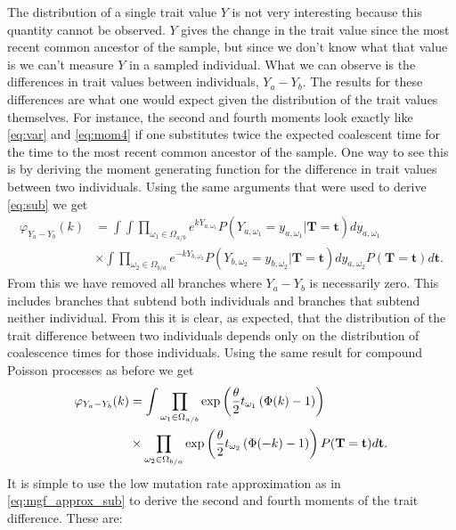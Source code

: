 The distribution of a single trait value $Y$ is not very interesting because
this quantity cannot be observed. $Y$ gives the change in the trait value since
the most recent common ancestor of the sample, but since we don't know what that
value is we can't measure $Y$ in a sampled individual. What we can observe is
the differences in trait values between individuals, $Y_a-Y_b$. The results for
these differences are what one would expect given the distribution of the trait
values themselves. For instance, the second and fourth moments look exactly like
\eqref{eq:var} and \eqref{eq:mom4} if one substitutes twice the expected
coalescent time for the time to the most recent common ancestor of the sample.
One way to see this is by deriving the moment generating function for the
difference in trait values between two individuals. Using the same arguments 
that were used to derive \eqref{eq:sub} we get
\begin{align}
  \varphi_{Y_a-Y_b}(k) &= \int \int \prod_{\omega_1 \in \Omega_{a/b}}
                         e^{kY_{a,\omega_1}}P(Y_{a,\omega_1}=y_{a,\omega_1}|\mathbf{T}=\mathbf{t})dy_{a,\omega_1} \nonumber \\
                         &\times \int \prod_{\omega_2 \in \Omega_{b/a}}
                         e^{-kY_{b,\omega_2}}P(Y_{b,\omega_2}=y_{b,\omega_2}|\mathbf{T}=\mathbf{t})dy_{a,\omega_2}
                         P(\mathbf{T}=\mathbf{t})d\mathbf{t}.
\end{align}
From this we have removed all branches where $Y_a-Y_b$ is necessarily zero. This
includes branches that subtend both individuals and branches that subtend
neither individual. From this it is clear, as expected, that the distribution of
the trait difference between two individuals depends only on the distribution of
coalescence times for those individuals. Using the same result for compound
Poisson processes as before we get
\begin{align}
  \varphi_{Y_a-Y_b}(k) &= \int \prod_{\omega_1 \in \Omega_{a/b}} 
                         \exp\left( \frac{\theta}{2} t_{\omega_1} \left( \Phi(k) - 1\right) \right) \nonumber \\
                       &\times \prod_{\omega_2 \in \Omega_{b/a}} 
                         \exp\left( \frac{\theta}{2} t_{\omega_2} \left( \Phi(-k) - 1\right) \right) 
                         P(\mathbf{T}=\mathbf{t})d\mathbf{t}.
\end{align}
It is simple to use the low mutation rate approximation as in
\eqref{eq:mgf_approx_sub} to derive the second and fourth moments of the trait
difference. These are:
